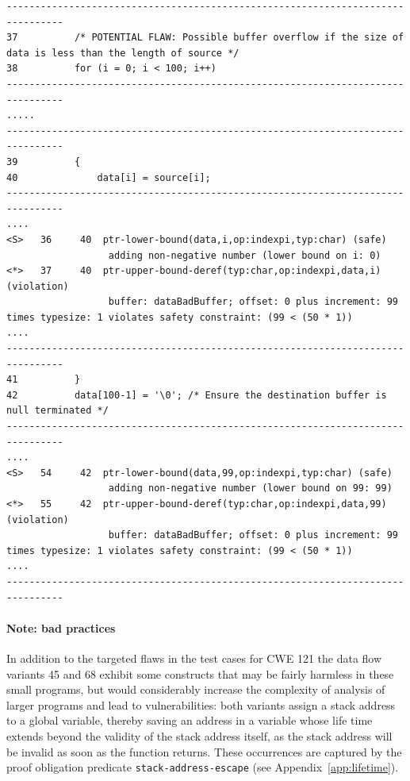 \documentclass[11pt]{article}
\begin{document}
\begin{tiny}
\begin{verbatim}
--------------------------------------------------------------------------------
37          /* POTENTIAL FLAW: Possible buffer overflow if the size of data is less than the length of source */
38          for (i = 0; i < 100; i++)
--------------------------------------------------------------------------------
.....
--------------------------------------------------------------------------------
39          {
40              data[i] = source[i];
--------------------------------------------------------------------------------
....
<S>   36     40  ptr-lower-bound(data,i,op:indexpi,typ:char) (safe)
                  adding non-negative number (lower bound on i: 0)
<*>   37     40  ptr-upper-bound-deref(typ:char,op:indexpi,data,i) (violation)
                  buffer: dataBadBuffer; offset: 0 plus increment: 99 times typesize: 1 violates safety constraint: (99 < (50 * 1))
....
--------------------------------------------------------------------------------
41          }
42          data[100-1] = '\0'; /* Ensure the destination buffer is null terminated */
--------------------------------------------------------------------------------
....
<S>   54     42  ptr-lower-bound(data,99,op:indexpi,typ:char) (safe)
                  adding non-negative number (lower bound on 99: 99)
<*>   55     42  ptr-upper-bound-deref(typ:char,op:indexpi,data,99) (violation)
                  buffer: dataBadBuffer; offset: 0 plus increment: 99 times typesize: 1 violates safety constraint: (99 < (50 * 1))
....
--------------------------------------------------------------------------------
\end{verbatim}
\end{tiny}

\paragraph{Note: bad practices}
In addition to the targeted flaws in the test cases for CWE 121 the data flow
variants 45 and 68 exhibit some constructs that may be fairly harmless in these
small programs, but would considerably increase the complexity of analysis of
larger programs and lead to vulnerabilities: both  variants  assign a stack 
address to a global variable,
thereby saving an address in a variable whose life time extends beyond the
validity of the stack address itself, as the stack address will be invalid as
soon as the function returns. These occurrences are captured by the 
proof obligation predicate {\tt stack-address-escape} (see Appendix~\ref{app:lifetime}).
\end{document}
